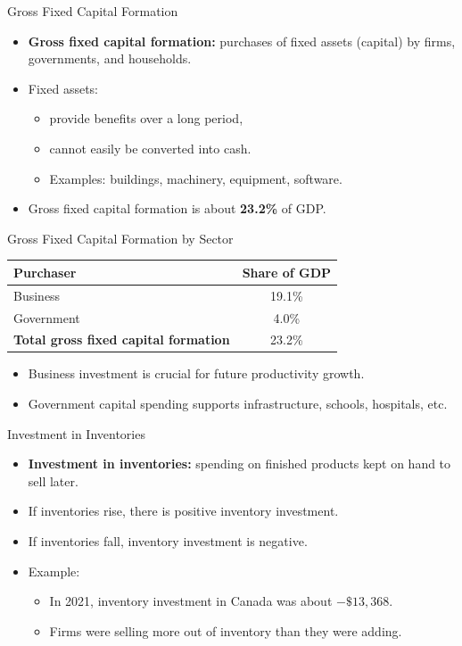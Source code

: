 \documentclass[aspectratio=169]{beamer}
\begin{document}
\begin{frame}{Gross Fixed Capital Formation}
\transfade
\begin{itemize}
  \item \textbf{Gross fixed capital formation:} purchases of fixed assets (capital) by firms, governments, and households.
  \item Fixed assets:
  \begin{itemize}
    \item provide benefits over a long period,
    \item cannot easily be converted into cash.
    \item Examples: buildings, machinery, equipment, software.
  \end{itemize}
  \item Gross fixed capital formation is about \textbf{23.2\%} of GDP.
\end{itemize}
\end{frame}

\begin{frame}{Gross Fixed Capital Formation by Sector}
\transfade
\small
\begin{tabular}{l c}
\toprule
\textbf{Purchaser} & \textbf{Share of GDP} \\
\midrule
Business & 19.1\% \\
Government & 4.0\% \\
\midrule
\textbf{Total gross fixed capital formation} & 23.2\% \\
\bottomrule
\end{tabular}

\vspace{0.7em}
\begin{itemize}
  \item Business investment is crucial for \alert{future productivity growth}.
  \item Government capital spending supports infrastructure, schools, hospitals, etc.
\end{itemize}
\end{frame}

\begin{frame}{Investment in Inventories}
\transfade
\begin{itemize}
  \item \textbf{Investment in inventories:} spending on finished products kept on hand to sell later.
  \item If inventories rise, there is \alert{positive} inventory investment.
  \item If inventories fall, inventory investment is \alert{negative}.
  \item Example:
  \begin{itemize}
    \item In 2021, inventory investment in Canada was about \(-\$13{,}368\).
    \item Firms were selling more out of inventory than they were adding.
  \end{itemize}
\end{itemize}
\end{frame}
\end{document}
